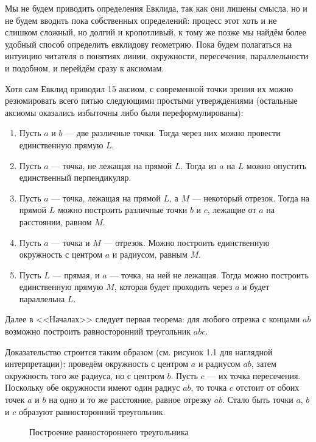 Мы не будем приводить определения Евклида, так как они лишены смысла, но и не будем вводить пока собственных определений: процесс этот хоть и не слишком сложный, но долгий и кропотливый, к тому же позже мы найдём более удобный способ определить евклидову геометрию. Пока будем полагаться на интуицию читателя о понятиях линии, окружности, пересечения, параллельности и подобном, и перейдём сразу к аксиомам.

Хотя сам Евклид приводил 15 аксиом, с современной точки зрения их можно резюмировать всего пятью следующими простыми утверждениями (остальные аксиомы оказались избыточны либо были переформулированы):

\begin{enumerate}
\item Пусть $a$ и $b$ --- две различные точки. Тогда через них можно провести единственную прямую $L$.
\item Пусть $a$ --- точка, не лежащая на прямой $L$. Тогда из $a$ на $L$ можно опустить единственный перпендикуляр.
\item Пусть $a$ --- точка, лежащая на прямой $L$, а $M$ --- некоторый отрезок. Тогда на прямой $L$ можно построить различные точки $b$ и $c$, лежащие от $a$ на расстоянии, равном $M$.
\item Пусть $a$ --- точка и $M$ --- отрезок. Можно построить единственную окружность с центром $a$ и радиусом, равным $M$.
\item Пусть $L$ --- прямая, и $a$ --- точка, на ней не лежащая. Тогда можно построить единственную прямую $M$, которая будет проходить через $a$ и будет параллельна $L$.
\end{enumerate}

Далее в <<Началах>> следует первая теорема: для любого отрезка с концами $ab$ возможно построить равносторонний треугольник $abc$.

Доказательство строится таким образом (см. рисунок 1.1 для наглядной интерпретации): проведём окружность с центром $a$ и радиусом $ab$, затем окружность того же радиуса, но с центром $b$. Пусть $c$ --- их точка пересечения. Поскольку обе окружности имеют один радиус $ab$, то точка $c$ отстоит от обоих точек $a$ и $b$ на одно и то же расстояние, равное отрезку $ab$. Стало быть точки $a$, $b$ и $c$ образуют равносторонний треугольник.

\begin{figure}[h]
\centering
{}
\caption{Построение равностороннего треугольника}
\end{figure}

